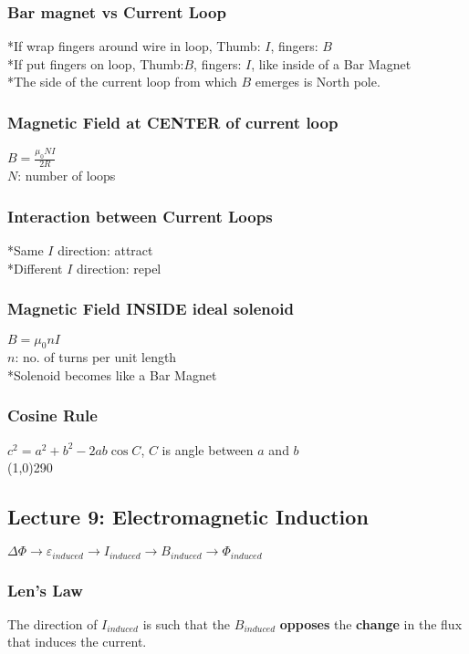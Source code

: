 \documentclass[10 pt]{article}
\begin{document}
\begin{multicols}{2}
\subsubsection*{Bar magnet vs Current Loop}
*If wrap fingers around wire in loop, Thumb: $I$, fingers: $B$ \\
*If put fingers on loop, Thumb:$B$, fingers: $I$, like inside of a Bar Magnet \\
*The side of the current loop from which $B$ emerges is North pole.

\subsubsection*{Magnetic Field at CENTER of current loop}
$B = \frac{\mu_{0}NI}{2R}$ \\
$N$: number of loops

\subsubsection*{Interaction between Current Loops}
*Same $I$ direction: attract \\
*Different $I$ direction: repel

\subsubsection*{Magnetic Field INSIDE ideal solenoid}
$B = \mu_{0}nI$ \\
$n$: no. of turns per unit length \\
*Solenoid becomes like a Bar Magnet
\subsubsection*{Cosine Rule}
$c^2 = a^2 + b^2 - 2ab \cos{C}$, $C$ is angle between $a$ and $b$ \\
\line(1,0){290}
\subsection*{Lecture 9: Electromagnetic Induction}
$\Delta \Phi \rightarrow \varepsilon_{induced} \rightarrow I_{induced} \rightarrow B_{induced} \rightarrow \Phi_{induced}$
\subsubsection*{Len's Law} 
The direction of $I_{induced}$ is such that the $B_{induced}$ \textbf{opposes} the \textbf{change} in the flux that induces the current.

\end{multicols}
\end{document}
